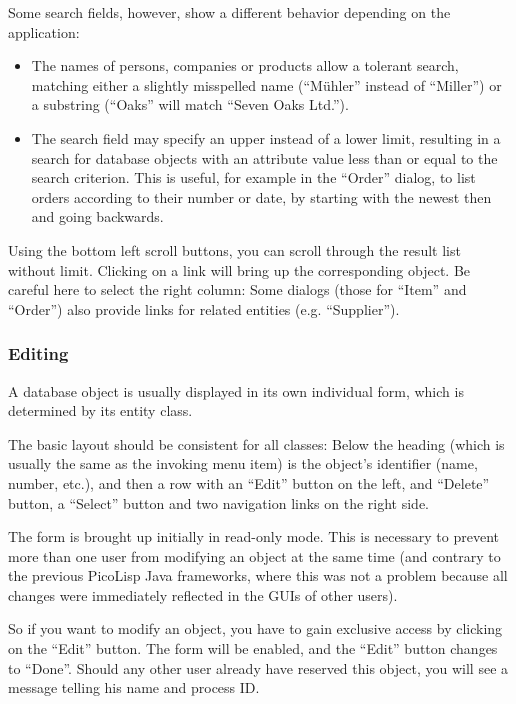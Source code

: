 Some search fields, however, show a different behavior depending on the
application:

\begin{itemize}
\item The names of persons, companies or products allow a tolerant search,
   matching either a slightly misspelled name (``Mühler'' instead of
   ``Miller'') or a substring (``Oaks'' will match ``Seven Oaks Ltd.'').
\item The search field may specify an upper instead of a lower limit,
   resulting in a search for database objects with an attribute value
   less than or equal to the search criterion. This is useful, for
   example in the ``Order'' dialog, to list orders according to their
   number or date, by starting with the newest then and going backwards.
\end{itemize}

Using the bottom left scroll buttons, you can scroll through the result
list without limit. Clicking on a link will bring up the corresponding
object. Be careful here to select the right column: Some dialogs (those
for ``Item'' and ``Order'') also provide links for related entities (e.g.
``Supplier'').

\subsubsection{ Editing}
\label{sec:appl-devel-editing}%

A database object is usually displayed in its own individual form, which
is determined by its entity class.

The basic layout should be consistent for all classes: Below the heading
(which is usually the same as the invoking menu item) is the object's
identifier (name, number, etc.), and then a row with an ``Edit'' button on
the left, and ``Delete'' button, a ``Select'' button and two navigation
links on the right side.

The form is brought up initially in read-only mode. This is necessary to
prevent more than one user from modifying an object at the same time
(and contrary to the previous PicoLisp Java frameworks, where this was
not a problem because all changes were immediately reflected in the GUIs
of other users).

So if you want to modify an object, you have to gain exclusive access by
clicking on the ``Edit'' button. The form will be enabled, and the ``Edit''
button changes to ``Done''. Should any other user already have reserved
this object, you will see a message telling his name and process ID.

